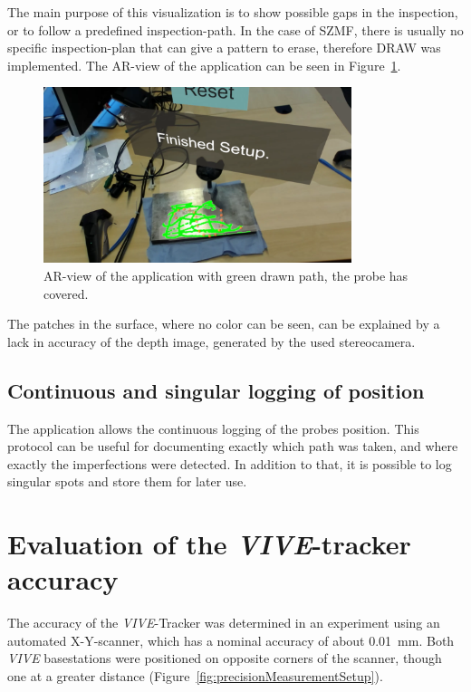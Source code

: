 \documentclass{VRARWorkshop}
\begin{document}
The main purpose of this visualization is to show possible gaps in the inspection, or to follow a predefined inspection-path.
In the case of SZMF, there is usually no specific inspection-plan that can give a pattern to erase, therefore {\sc DRAW} was implemented.
The AR-view of the application can be seen in Figure~\ref{fig:ARView}.

\begin{figure}[h!]
    \begin{center}
        \includegraphics[width=90mm]{images/AR-Screenshot}
        \caption{\label{fig:ARView} AR-view of the application with green drawn path, the probe has covered.}
    \end{center}
\end{figure}

The patches in the surface, where no color can be seen, can be explained by a lack in accuracy of the depth image, generated by the used stereocamera.

\subsection{Continuous and singular logging of position}
The application allows the continuous logging of the probes position.
This protocol can be useful for documenting exactly which path was taken, and where exactly the imperfections were detected.
In addition to that, it is possible to log singular spots and store them for later use.

\section{Evaluation of the \textit{VIVE}-tracker accuracy}
The accuracy of the \textit{VIVE}-Tracker was determined in an experiment using an automated X-Y-scanner, which has a nominal accuracy of about 0.01~mm.
Both \textit{VIVE} basestations were positioned on opposite corners of the scanner, though one at a greater distance (Figure~\ref{fig:precisionMeasurementSetup}).
\end{document}
